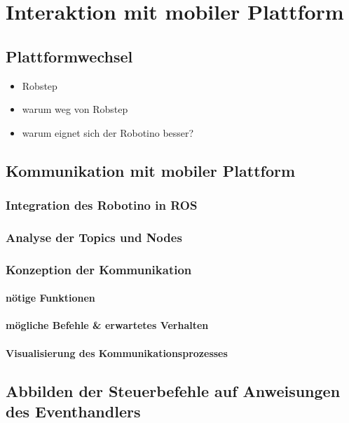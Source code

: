 \chapter{Interaktion mit mobiler Plattform}
	\section{Plattformwechsel}
	\begin{itemize}
	\item Robstep
	\item warum weg von Robstep
	\item warum eignet sich der Robotino besser?
	\end{itemize}
	\section{Kommunikation mit mobiler Plattform}
		\subsection{Integration des Robotino in ROS}
		\subsection{Analyse der Topics und Nodes}
		\subsection{Konzeption der Kommunikation}
			\subsubsection{nötige Funktionen}
			\subsubsection{mögliche Befehle \& erwartetes Verhalten}
			\subsubsection{Visualisierung des Kommunikationsprozesses}
	\section{Abbilden der Steuerbefehle auf Anweisungen des Eventhandlers}
	
